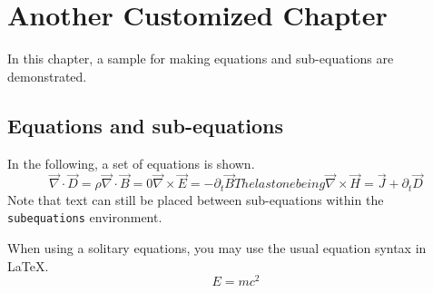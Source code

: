 \chapter{Another Customized Chapter}

In this chapter, a sample for making equations and sub-equations
are demonstrated.

\section{Equations and sub-equations}

\hspace{\parindent} In the following, a set of equations is shown.
\begin{subequations}
\newcommand\del{\overrightarrow{\nabla}}
\begin{equation}\label{eq:EGauss}
    \del \cdot \vec{D} = \rho
\end{equation}
\begin{equation}\label{eq:BGauss}
    \del \cdot \vec{B} = 0
\end{equation}
\begin{equation}\label{eq:Faraday}
    \del \times \vec{E} = -\partial_t \vec{B}
\end{equation}
The last one being
\begin{equation}\label{eq:Ampere-Maxwell}
    \del \times \vec{H} = \vec{J} + \partial_t \vec{D}
\end{equation}
\end{subequations}
Note that text can still be placed between sub-equations within
the \verb+subequations+ environment.

When using a solitary equations, you may use the usual equation
syntax in \LaTeX.
\begin{equation}\label{eq:Maxwell}
    E = mc^2
\end{equation}
